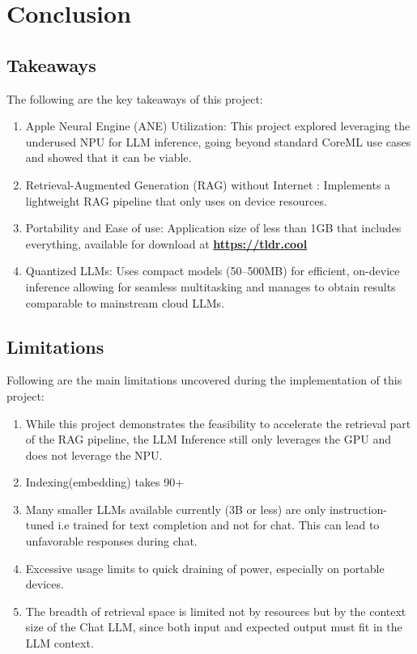 
\chapter{Conclusion}
\label{ch:Conclusion}

\section{Takeaways}
\label{sec:Takeaways}
The following are the key takeaways of this project:
\begin{enumerate}[label=\alph*.]
\item Apple Neural Engine (ANE) Utilization: This project explored leveraging the underused NPU for LLM inference, going beyond standard CoreML use cases and showed that it can be viable.

\item Retrieval-Augmented Generation (RAG) without Internet : Implements a lightweight RAG pipeline that only uses on device resources.

\item Portability and Ease of use: Application size of less than 1GB that includes everything, available for download at \href{https://tldr.cool}{\textbf{https://tldr.cool}}

\item Quantized LLMs: Uses compact models (50–500MB) for efficient, on-device inference allowing for seamless multitasking and manages to obtain results comparable to mainstream cloud LLMs.
\end{enumerate}
\section{Limitations}
\label{sec:Limitations}
Following are the main limitations uncovered during the implementation of this project:
\begin{enumerate}[label=\alph*.]
\item While this project demonstrates the feasibility to accelerate the retrieval part of the RAG pipeline, the LLM Inference still only leverages the GPU and does not leverage the NPU.

\item Indexing(embedding) takes 90+%

\item Many smaller LLMs available currently (3B or less) are only instruction-tuned i.e trained for text completion and not for chat. This can lead to unfavorable responses during chat.

\item Excessive usage limits to quick draining of power, especially on portable devices.

\item The breadth of retrieval space is limited not by resources but by the context size of the Chat LLM, since both input and expected output must fit in the LLM context.

\end{enumerate}
